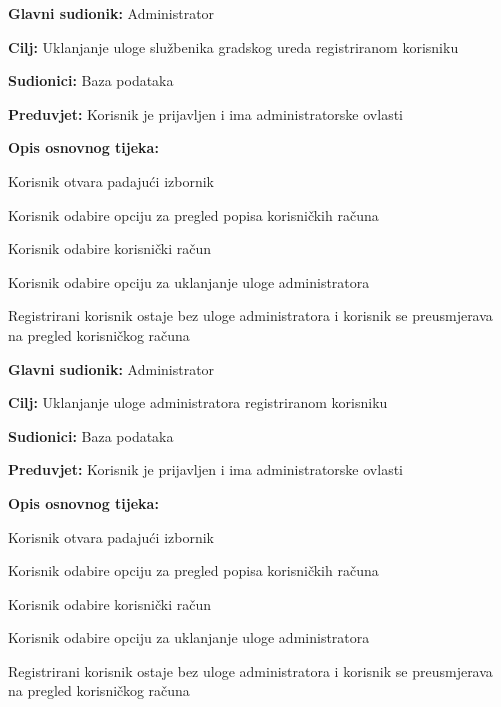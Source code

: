 \noindent {}
\begin{packed_item}

	\item \textbf{Glavni sudionik: }Administrator
	\item  \textbf{Cilj:} Uklanjanje uloge službenika gradskog ureda registriranom korisniku
	\item  \textbf{Sudionici:} Baza podataka
	\item  \textbf{Preduvjet:} Korisnik je prijavljen i ima administratorske ovlasti
	\item  \textbf{Opis osnovnog tijeka:}

	\item[] \begin{packed_enum}

		\item Korisnik otvara padajući izbornik 
		\item Korisnik odabire opciju za pregled popisa korisničkih računa
		\item Korisnik odabire korisnički račun
		\item Korisnik odabire opciju za uklanjanje uloge administratora
		\item Registrirani korisnik ostaje bez uloge administratora i korisnik se preusmjerava na pregled korisničkog računa
	\end{packed_enum}
\end{packed_item}


\noindent {}
\begin{packed_item}

	\item \textbf{Glavni sudionik: }Administrator
	\item  \textbf{Cilj:} Uklanjanje uloge administratora registriranom korisniku
	\item  \textbf{Sudionici:} Baza podataka
	\item  \textbf{Preduvjet:} Korisnik je prijavljen i ima administratorske ovlasti
	\item  \textbf{Opis osnovnog tijeka:}

	\item[] \begin{packed_enum}

		\item Korisnik otvara padajući izbornik 
		\item Korisnik odabire opciju za pregled popisa korisničkih računa
		\item Korisnik odabire korisnički račun
		\item Korisnik odabire opciju za uklanjanje uloge administratora
		\item Registrirani korisnik ostaje bez uloge administratora i korisnik se preusmjerava na pregled korisničkog računa
	\end{packed_enum}
\end{packed_item}

